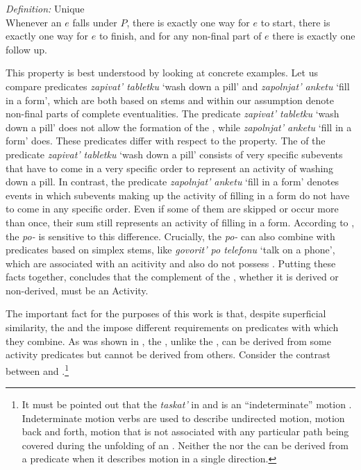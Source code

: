 \documentclass[output=paper,colorlinks,citecolor=brown,newtxmath]{langsci/langscibook}
\begin{document}
\eanoraggedright \textit{Definition:} Unique \smallskip\\
Whenever an  $e$ falls under $P$, there is exactly one way for $e$ to start, there is exactly one way for $e$ to finish, and for any non-final part of $e$ there is exactly one follow up.\label{ex:naumov:22}
\z

\noindent This property is best understood by looking at concrete examples. Let us compare predicates \textit{zapivat’ tabletku} `wash down a pill' and \textit{zapolnjat’ anketu} `fill in a form', which are both based on   stems and within our assumption denote non-final parts of complete eventualities. The predicate \textit{zapivat’ tabletku} `wash down a pill' does not allow the formation of the , while \textit{zapolnjat’ anketu} `fill in a form' does. These predicates differ with respect to the  property. The  of the predicate \textit{zapivat’ tabletku} `wash down a pill' consists of very specific subevents that have to come in a very specific order to represent an activity of washing down a pill. In contrast, the predicate \textit{zapolnjat’ anketu} `fill in a form' denotes events in which subevents making up the activity of filling in a form do not have to come in any specific order. Even if some of them are skipped or occur more than once, their sum still represents an activity of filling in a form. According to \citet{tatevosov2017temporal}, the  \textit{po-} is sensitive to this difference. Crucially, the  \textit{po-} can also combine with predicates based on simplex   stems, like \textit{govorit’ po telefonu} `talk on a phone', which are associated with an acitivity  and also do not possess . Putting these facts together, \citet{tatevosov2017temporal} concludes that the complement of the , whether it is derived or non-derived, must be an Activity.

The important fact for the purposes of this work is that, despite superficial similarity, the  and the  impose different requirements on predicates with which they combine. As was shown in , the , unlike the , can be derived from some activity predicates but cannot be derived from others. Consider the contrast between  and .\footnote{It must be pointed out that the  \textit{taskat’} in  and  is an ``indeterminate'' motion . Indeterminate motion verbs are used to describe undirected motion, motion back and forth, motion that is not associated with any particular path being covered during the unfolding of an . Neither the  nor the  can be derived from a predicate when it describes motion in a single direction.}
\end{document}
